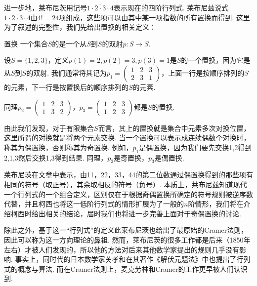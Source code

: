 进一步地，莱布尼茨用记号$\overline{1\cdot 2\cdot 3\cdot 4}$表示现在的四阶行列式. 莱布尼兹说式$\overline{1\cdot 2\cdot 3\cdot 4}$由$4!=24$项组成，这些项可以由其中某一项指数的所有置换而得到. 这里为了叙述的完整性，我们先给出置换的相关定义：
\begin{definition}{置换}{}
    一个集合$S$的是一个从$S$到$S$的双射$p:S\to S$.
\end{definition}

\begin{example}{}{}
    设$S=\{1,2,3\}$，定义$p(1)=2,p(2)=3,p(3)=1$是$S$的一个置换，因为它是从$S$到$S$的双射. 我们通常将其记为$p_1=\begin{pmatrix}
            1 & 2 & 3 \\
            2 & 3 & 1
        \end{pmatrix}$，上面一行是按顺序排列的$S$的元素，下一行是按置换后的顺序排列的$S$的元素.

    同理$p_2=\begin{pmatrix}
            1 & 2 & 3 \\
            1 & 3 & 2
        \end{pmatrix}$，$p_3=\begin{pmatrix}
            1 & 2 & 3 \\
            1 & 2 & 3
        \end{pmatrix}$都是$S$的置换.
\end{example}

由此我们发现，对于有限集合$S$而言，其上的置换就是集合中元素多次对换位置，这里所谓的对换就是将两个元素交换. 当一个置换可以表示成连续偶数个对换时，称其为偶置换，否则称其为奇置换. 例如，$p_1$是偶置换，因为我们要先交换1,2得到2,1,3然后交换1,3得到结果. 同理，$p_2$是奇置换，$p_3$是偶置换.

莱布尼茨在文章中表示，由11，22，33，44的第二位数通过偶置换得到的那些项有相同的符号（取正号），其余取相反的符号（负号）. 本质上，莱布尼兹知道现代一个行列式的一个组合定义，区别仅在于根据奇偶置换所确定的符号规则被逆序数代替，并且柯西也将这一低阶行列式的情形扩展为了一般的$n$阶情形，我们将在介绍柯西时给出相关的结论，届时我们也将进一步完善上面对于奇偶置换的讨论.

除此之外，基于这一``行列式''的定义此莱布尼茨也给出了最原始的Cramer法则，因此可以称为这一方向理论的鼻祖. 然而，莱布尼茨的很多工作都是后来（1850年左右）才被人们发现的，所以他的方法对后来其他数学家提出的规则几乎没有影响. 事实上，同时代的日本数学家关孝和在其著作《解伏元题法》中也提出了行列式的概念与算法. 而在Cramer法则上，麦克劳林和Cramer的工作更早被人们认识到.

